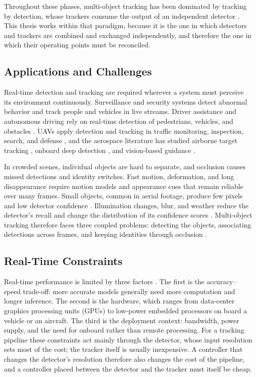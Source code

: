 Throughout these phases, multi-object tracking has been dominated by tracking by detection, whose trackers consume the output of an independent detector \cite{bewley2016sort,zhang2022bytetrack}. This thesis works within that paradigm, because it is the one in which detectors and trackers are combined and exchanged independently, and therefore the one in which their operating points must be reconciled.

\subsection{Applications and Challenges}\label{sec:bg-challenges}
Real-time detection and tracking are required wherever a system must perceive its environment continuously. Surveillance and security systems detect abnormal behavior and track people and vehicles in live streams. Driver assistance and autonomous driving rely on real-time detection of pedestrians, vehicles, and obstacles \cite{geiger2012kitti}. UAVs apply detection and tracking in traffic monitoring, inspection, search, and defense \cite{zhu2022visdrone,bakirci2025lowpower}, and the aerospace literature has studied airborne target tracking \cite{miller2015multitarget,desai2017uavfeature}, onboard deep detection \cite{lu2024uavdetection,choi2022docking}, and vision-based guidance \cite{parsons2019refueling}.

In crowded scenes, individual objects are hard to separate, and occlusion causes missed detections and identity switches. Fast motion, deformation, and long disappearance require motion models and appearance cues that remain reliable over many frames. Small objects, common in aerial footage, produce few pixels and low detector confidence \cite{cheng2023smallobject}. Illumination changes, blur, and weather reduce the detector's recall and change the distribution of its confidence scores \cite{chae2024radar}. Multi-object tracking therefore faces three coupled problems: detecting the objects, associating detections across frames, and keeping identities through occlusion \cite{li2025motreview}.

\subsection{Real-Time Constraints}\label{sec:bg-realtime}
Real-time performance is limited by three factors \cite{bakirci2025lowpower}. The first is the accuracy--speed trade-off: more accurate models generally need more computation and longer inference. The second is the hardware, which ranges from data-center graphics processing units (GPUs) to low-power embedded processors on board a vehicle or an aircraft. The third is the deployment context: bandwidth, power supply, and the need for onboard rather than remote processing. For a tracking pipeline these constraints act mainly through the detector, whose input resolution sets most of the cost; the tracker itself is usually inexpensive. A controller that changes the detector's resolution therefore also changes the cost of the pipeline, and a controller placed between the detector and the tracker must itself be cheap.

